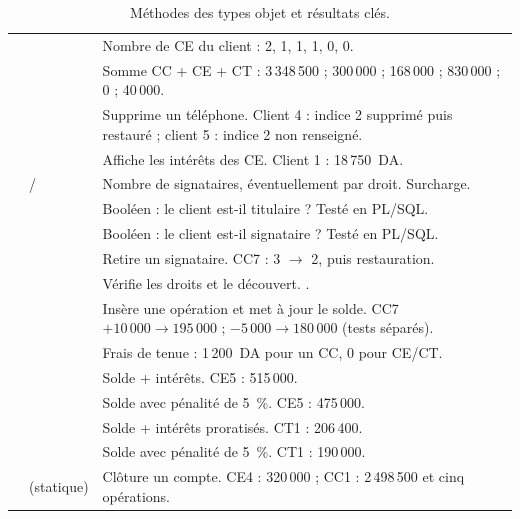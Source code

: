 \begin{table}[htbp]
  \centering
  \small
  \caption{Méthodes des types objet et résultats clés.}
  \label{tab:methodes}
  \begin{tabularx}{\textwidth}{@{}L{3.4cm}L{4.7cm}X@{}}
    \toprule
     &  &  \\
    \midrule
     &  &
    Nombre de CE du client : 2, 1, 1, 1, 0, 0. \\
     &  &
    Somme CC + CE + CT : 3\,348\,500 ; 300\,000 ; 168\,000 ; 830\,000 ;
    0 ; 40\,000. \\
     &  &
    Supprime un téléphone. Client 4 : indice 2 supprimé puis restauré ;
    client 5 : indice 2 non renseigné. \\
     &  &
    Affiche les intérêts des CE. Client 1 : 18\,750~DA. \\
     &  /
     &
    Nombre de signataires, éventuellement par droit. Surcharge. \\
     &  &
    Booléen : le client est-il titulaire ? Testé en PL/SQL. \\
     &  &
    Booléen : le client est-il signataire ? Testé en PL/SQL. \\
     &  &
    Retire un signataire. CC7 : 3 $\rightarrow$ 2, puis restauration. \\
     &  &
    Vérifie les droits et le découvert.
    . \\
     &  &
    Insère une opération et met à jour le solde. CC7 $+10\,000 \rightarrow
    195\,000$ ; $-5\,000 \rightarrow 180\,000$ (tests séparés). \\
     &  &
    Frais de tenue : 1\,200~DA pour un CC, 0 pour CE/CT. \\
     &  &
    Solde + intérêts. CE5 : 515\,000. \\
     &  &
    Solde avec pénalité de 5~\%. CE5 : 475\,000. \\
     &  &
    Solde + intérêts proratisés. CT1 : 206\,400. \\
     &  &
    Solde avec pénalité de 5~\%. CT1 : 190\,000. \\
     &  (statique) &
    Clôture un compte. CE4 : 320\,000 ; CC1 : 2\,498\,500 et cinq
    opérations. \\
    \bottomrule
  \end{tabularx}
\end{table}

